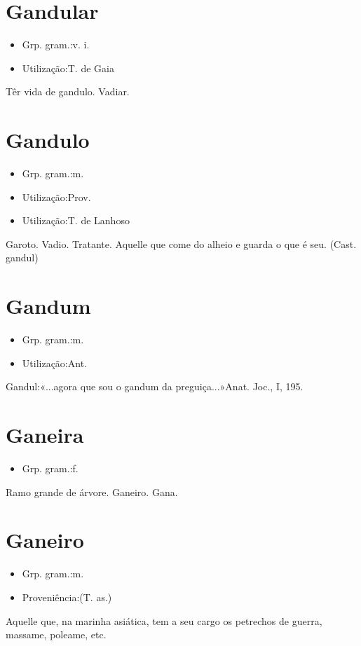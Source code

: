 \section{Gandular}
\begin{itemize}
\item {Grp. gram.:v. i.}
\end{itemize}
\begin{itemize}
\item {Utilização:T. de Gaia}
\end{itemize}
Têr vida de gandulo.
Vadiar.
\section{Gandulo}
\begin{itemize}
\item {Grp. gram.:m.}
\end{itemize}
\begin{itemize}
\item {Utilização:Prov.}
\end{itemize}
\begin{itemize}
\item {Utilização:T. de Lanhoso}
\end{itemize}
Garoto.
Vadio.
Tratante.
Aquelle que come do alheio e guarda o que é seu.
(Cast. \textunderscore gandul\textunderscore )
\section{Gandum}
\begin{itemize}
\item {Grp. gram.:m.}
\end{itemize}
\begin{itemize}
\item {Utilização:Ant.}
\end{itemize}
Gandul:«\textunderscore ...agora que sou o gandum da preguiça...\textunderscore »\textunderscore Anat. Joc.\textunderscore , I, 195.
\section{Ganeira}
\begin{itemize}
\item {Grp. gram.:f.}
\end{itemize}
Ramo grande de árvore.
Ganeiro.
Gana.
\section{Ganeiro}
\begin{itemize}
\item {Grp. gram.:m.}
\end{itemize}
\begin{itemize}
\item {Proveniência:(T. as.)}
\end{itemize}
Aquelle que, na marinha asiática, tem a seu cargo os petrechos de guerra, massame, poleame, etc.
